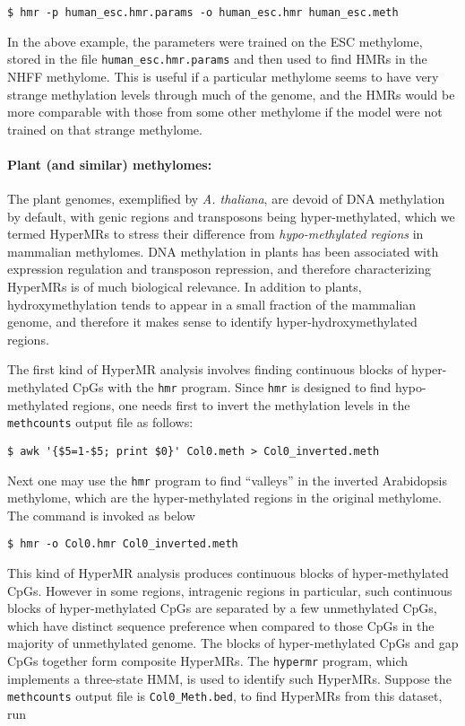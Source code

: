 \documentclass[10pt]{article}
\newcommand{\prog}[1]{\texttt{#1}}
\newcommand{\fn}[1]{\texttt{#1}}
\begin{document}
\begin{verbatim}
$ hmr -p human_esc.hmr.params -o human_esc.hmr human_esc.meth
\end{verbatim}

In the above example, the parameters were trained on the ESC
methylome, stored in the file \fn{human\_esc.hmr.params} and then
used to find HMRs in the NHFF methylome.
This is useful if a particular methylome
seems to have very strange methylation levels through much of the
genome, and the HMRs would be more comparable with those from some
other methylome if the model were not trained on that strange
methylome.

\paragraph{Plant (and similar) methylomes:}
The plant genomes, exemplified by \textit{A. thaliana}, are devoid of
DNA methylation by default, with genic regions and transposons being
hyper-methylated, which we termed HyperMRs to stress their difference
from \textit{hypo-methylated regions} in mammalian methylomes. DNA
methylation in plants has been associated with expression regulation
and transposon repression, and therefore characterizing HyperMRs is of
much biological relevance. In addition to plants, hydroxymethylation
tends to appear in a small fraction of the mammalian genome, and therefore
it makes sense to identify hyper-hydroxymethylated regions.

The first kind of HyperMR analysis involves finding continuous blocks
of hyper-methylated CpGs with the \prog{hmr} program. Since \prog{hmr}
is designed to find hypo-methylated regions, one needs first to invert
the methylation levels in the \prog{methcounts} output file as
follows:

\begin{verbatim}
$ awk '{$5=1-$5; print $0}' Col0.meth > Col0_inverted.meth
\end{verbatim}

Next one may use the \prog{hmr} program to find ``valleys'' in the
inverted Arabidopsis methylome, which are the hyper-methylated regions
in the original methylome. The command is invoked as below

\begin{verbatim}
$ hmr -o Col0.hmr Col0_inverted.meth
\end{verbatim}

This kind of HyperMR analysis produces continuous blocks of
hyper-methylated CpGs. However in some regions, intragenic regions in
particular, such continuous blocks of hyper-methylated CpGs are
separated by a few unmethylated CpGs, which have distinct sequence
preference when compared to those CpGs in the majority of unmethylated
genome. The blocks of hyper-methylated CpGs and gap CpGs together form
composite HyperMRs. The \prog{hypermr} program, which implements a
three-state HMM, is used to identify such HyperMRs. Suppose the
\prog{methcounts} output file is \fn{Col0\_Meth.bed}, to find HyperMRs
from this dataset, run
\end{document}

